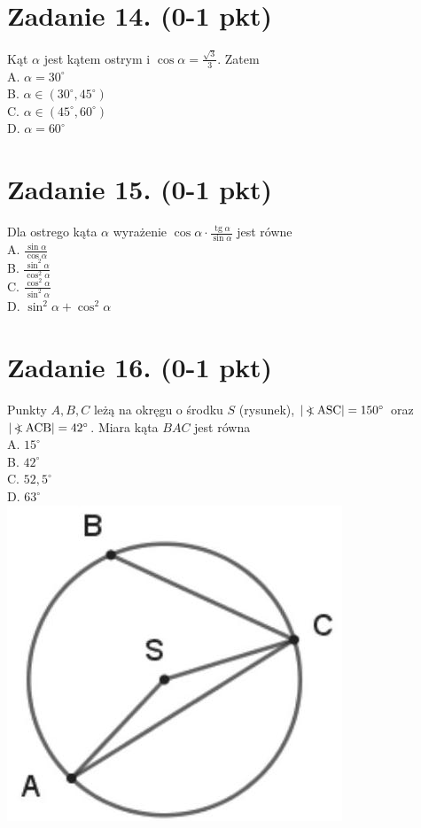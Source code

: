 \documentclass[10pt]{article}
\newcommand\Varangle{\mathop{{<\!\!\!\!\!\text{\small)}}\:}\nolimits}
\begin{document}
\section*{Zadanie 14. (0-1 pkt)}
Kąt \(\alpha\) jest kątem ostrym i \(\cos \alpha=\frac{\sqrt{3}}{3}\). Zatem\\
A. \(\alpha=30^{\circ}\)\\
B. \(\alpha \in\left(30^{\circ}, 45^{\circ}\right)\)\\
C. \(\alpha \in\left(45^{\circ}, 60^{\circ}\right)\)\\
D. \(\alpha=60^{\circ}\)

\section*{Zadanie 15. (0-1 pkt)}
Dla ostrego kąta \(\alpha\) wyrażenie \(\cos \alpha \cdot \frac{\operatorname{tg} \alpha}{\sin \alpha}\) jest równe\\
A. \(\frac{\sin \alpha}{\cos \alpha}\)\\
B. \(\frac{\sin ^{2} \alpha}{\cos ^{2} \alpha}\)\\
C. \(\frac{\cos ^{2} \alpha}{\sin ^{2} \alpha}\)\\
D. \(\sin ^{2} \alpha+\cos ^{2} \alpha\)

\section*{Zadanie 16. (0-1 pkt)}
Punkty \(A, B, C\) leżą na okręgu o środku \(S\) (rysunek), \(|\Varangle \mathrm{ASC}|=150^{\circ}\) oraz \(|\Varangle \mathrm{ACB}|=42^{\circ}\). Miara kąta \(B A C\) jest równa\\
A. \(15^{\circ}\)\\
B. \(42^{\circ}\)\\
C. \(52,5^{\circ}\)\\
D. \(63^{\circ}\)\\
\includegraphics[max width=\textwidth, center]{2024_11_21_832f1bc2b626663f1df2g-06}
\end{document}
